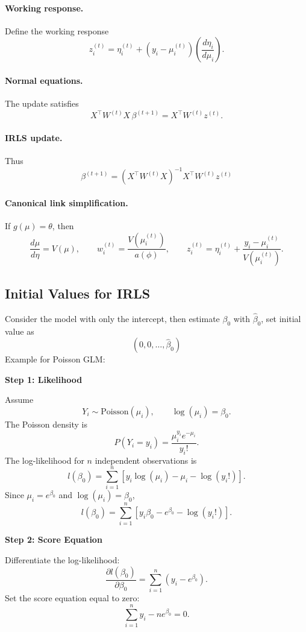 \documentclass[11pt]{article}
\theoremstyle{definition}
\begin{document}
\paragraph{Working response.}
Define the working response
\[
z_i^{(t)}
=
\eta_i^{(t)}
+
(y_i-\mu_i^{(t)})
\left(\frac{d\eta_i}{d\mu_i}\right).
\]

\paragraph{Normal equations.}
The update satisfies
\[
X^\top W^{(t)} X\,\beta^{(t+1)}
=
X^\top W^{(t)} z^{(t)}.
\]

\paragraph{IRLS update.}
Thus
\[
\boxed{
\beta^{(t+1)}
=
\left(X^\top W^{(t)} X\right)^{-1}
X^\top W^{(t)} z^{(t)}
}
\]

\paragraph{Canonical link simplification.}
If $g(\mu)=\theta$, then
\[
\frac{d\mu}{d\eta}=V(\mu),
\qquad
w_i^{(t)}=\frac{V(\mu_i^{(t)})}{a(\phi)},
\qquad
z_i^{(t)}=\eta_i^{(t)}+\frac{y_i-\mu_i^{(t)}}{V(\mu_i^{(t)})}.
\]
\subsection{Initial Values for IRLS}
Consider the model with only the intercept, then estimate $\beta_0$ with $\hat\beta_0$, set initial value as
$$
(0,0,\dots,\hat\beta_0)
$$
Example for Poisson GLM:

\textbf{Step 1: Likelihood}

Assume
\[
Y_i \sim \text{Poisson}(\mu_i), \qquad \log(\mu_i) = \beta_0.
\]
The Poisson density is
\[
P(Y_i=y_i) = \frac{\mu_i^{y_i} e^{-\mu_i}}{y_i!}.
\]
The log-likelihood for $n$ independent observations is
\[
l(\beta_0)
=
\sum_{i=1}^{n}
\left[
y_i \log(\mu_i) - \mu_i - \log(y_i!)
\right].
\]
Since $\mu_i = e^{\beta_0}$ and $\log(\mu_i)=\beta_0$,
\[
l(\beta_0)
=
\sum_{i=1}^{n}
\left[
y_i \beta_0 - e^{\beta_0} - \log(y_i!)
\right].
\]


\textbf{Step 2: Score Equation}

Differentiate the log-likelihood:
\[
\frac{\partial l(\beta_0)}{\partial \beta_0}
=
\sum_{i=1}^{n}
\left(
y_i - e^{\beta_0}
\right).
\]
Set the score equation equal to zero:
\[
\sum_{i=1}^{n} y_i - n e^{\beta_0} = 0.
\]
\end{document}
